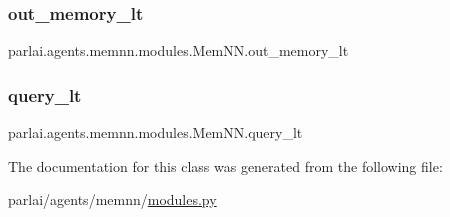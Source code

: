 \subsubsection{\texorpdfstring{out\+\_\+memory\+\_\+lt}{out\_memory\_lt}}
{\footnotesize\ttfamily parlai.\+agents.\+memnn.\+modules.\+Mem\+N\+N.\+out\+\_\+memory\+\_\+lt}

\mbox{\label{classparlai_1_1agents_1_1memnn_1_1modules_1_1MemNN_aa6b47d1470856e76a31e266a049da848}} 
\subsubsection{\texorpdfstring{query\+\_\+lt}{query\_lt}}
{\footnotesize\ttfamily parlai.\+agents.\+memnn.\+modules.\+Mem\+N\+N.\+query\+\_\+lt}



The documentation for this class was generated from the following file\+:\begin{DoxyCompactItemize}
\item 
parlai/agents/memnn/\hyperlink{parlai_2agents_2memnn_2modules_8py}{modules.\+py}\end{DoxyCompactItemize}
